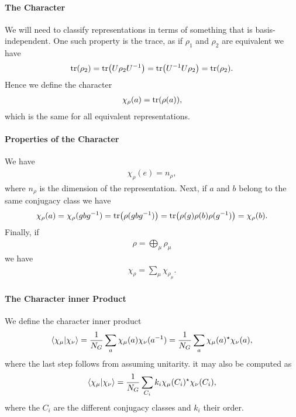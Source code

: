 \paragraph{The Character}
We will need to classify representations in terms of something that is basis-independent. One such property is the trace, as if $\rho_{1}$ and $\rho_{2}$ are equivalent we have
\begin{align*}
	\tr(\rho_{2}) = \tr(U\rho_{2}U^{-1}) = \tr(U^{-1}U\rho_{2}) = \tr(\rho_{2}).
\end{align*}
Hence we define the character
\begin{align*}
	\chi_{\rho}(a) = \tr(\rho(a)),
\end{align*}
which is the same for all equivalent representations.

\paragraph{Properties of the Character}
We have
\begin{align*}
	\chi_{\rho}(e) = n_{\rho},
\end{align*}
where $n_{\rho}$ is the dimension of the representation. Next, if $a$ and $b$ belong to the same conjugacy class we have
\begin{align*}
	\chi_{\rho}(a) = \chi_{\rho}(gbg^{-1}) = \tr(\rho(gbg^{-1})) = \tr(\rho(g)\rho(b)\rho(g^{-1})) = \chi_{\rho}(b).
\end{align*}
Finally, if
\begin{align*}
	\rho = \bigoplus\limits_{\mu}\rho_{\mu}
\end{align*}
we have
\begin{align*}
	\chi_{\rho} = \sum\limits_{\mu}\chi_{\rho_{\mu}}.
\end{align*}

\paragraph{The Character inner Product}
We define the character inner product
\begin{align*}
	\braket{\chi_{\mu}}{\chi_{\nu}} = \frac{1}{N_{G}}\sum\limits_{a}\chi_{\mu}(a)\chi_{\nu}(a^{-1}) = \frac{1}{N_{G}}\sum\limits_{a}\chi_{\mu}(a)^{\star}{\chi_{\nu}(a)},
\end{align*}
where the last step follows from assuming unitarity. it may also be computed as
\begin{align*}
	\braket{\chi_{\mu}}{\chi_{\nu}} = \frac{1}{N_{G}}\sum\limits_{C_{i}}k_{i}\chi_{\mu}(C_{i})^{\star}{\chi_{\nu}(C_{i})},
\end{align*}
where the $C_{i}$ are the different conjugacy classes and $k_{i}$ their order.

